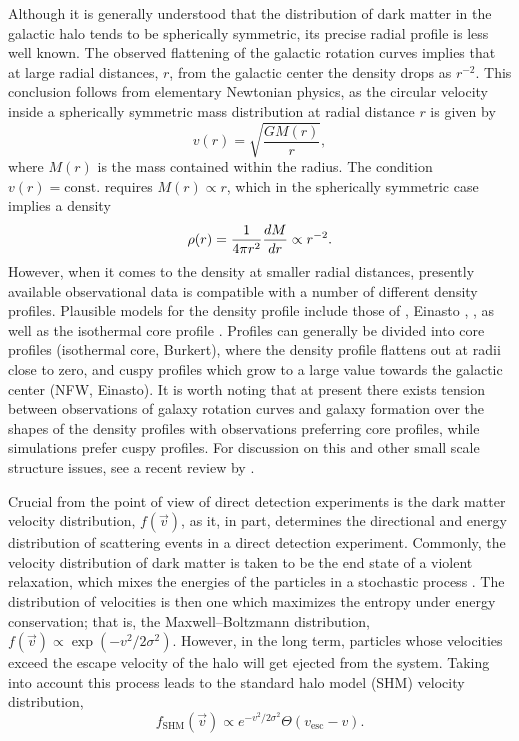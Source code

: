 Although it is generally understood that the distribution of dark matter in the galactic halo tends to be spherically symmetric, its precise radial profile is less well known. The observed flattening of the galactic rotation curves implies that at large radial distances, $r$, from the galactic center the density drops as $r^{-2}$. This conclusion follows from elementary Newtonian physics, as the circular velocity inside a spherically symmetric mass distribution at radial distance $r$ is given by
\begin{equation}
    v(r)=\sqrt{\frac{GM(r)}{r}},
\end{equation}
where $M(r)$ is the mass contained within the radius. The condition $v(r)=\text{const.}$ requires $M(r)\propto r$, which in the spherically symmetric case implies a density
\begin{equation}
    \rho(r)=\frac{1}{4\pi r^2}\frac{dM}{dr}\propto r^{-2}.
\end{equation}
However, when it comes to the density at smaller radial distances, presently available observational data is compatible with a number of different density profiles. Plausible models for the density profile include those of \textcite{NavarroFrenkWhite1996}, Einasto \parencites{Einasto1965, MerrittEtAl2006}, \textcite{Burkert1995}, as well as the isothermal core profile \parencites{BahcallSoneira1980, BegemanBroeilsSanders1991}. Profiles can generally be divided into core profiles (isothermal core, Burkert), where the density profile flattens out at radii close to zero, and cuspy profiles which grow to a large value towards the galactic center (NFW, Einasto). It is worth noting that at present there exists tension between observations of galaxy rotation curves and galaxy formation over the shapes of the density profiles with observations preferring core profiles, while simulations prefer cuspy profiles. For discussion on this and other small scale structure issues, see a recent review by \textcite{TulinYu2018}.

Crucial from the point of view of direct detection experiments is the dark matter velocity distribution, $f(\vec{v})$, as it, in part, determines the directional and energy distribution of scattering events in a direct detection experiment. Commonly, the velocity distribution of dark matter is taken to be the end state of a violent relaxation, which mixes the energies of the particles in a stochastic process \parencite{LyndenBell1967}. The distribution of velocities is then one which maximizes the entropy under energy conservation; that is, the Maxwell--Boltzmann distribution, $f(\vec{v})\propto \exp(-v^2/2\sigma^2)$. However, in the long term, particles whose velocities exceed the escape velocity of the halo will get ejected from the system. Taking into account this process leads to the standard halo model (SHM) velocity distribution,
\begin{equation}
    f_\text{SHM}(\vec{v})\propto e^{-v^2/2\sigma^2}\Theta(v_\text{esc}-v).
    \label{eq:shm-dist}
\end{equation}

